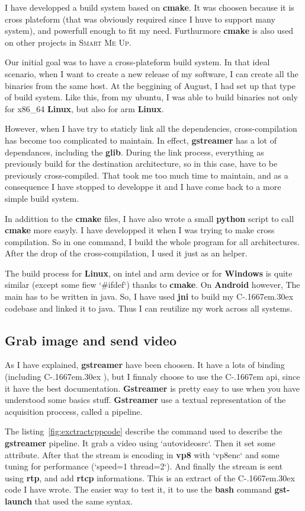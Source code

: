 \documentclass[a4paper,11pt]{custom}
\newcommand{\smu}{\textsc{Smart Me Up}}
\newcommand{\rtp}{\textbf{rtp}\xspace}
\newcommand{\rtcp}{\textbf{rtcp}\xspace}
\newcommand{\gstreamer}{\textbf{gstreamer}\xspace}
\newcommand{\Gstreamer}{\textbf{Gstreamer}\xspace}
\newcommand{\vpx}{\textbf{vp8}\xspace}
\newcommand{\cmake}{\textbf{cmake}\xspace}
\newcommand{\jni}{\textbf{jni}\xspace}
\newcommand{\bash}{\textbf{bash}\xspace}
\newcommand{\python}{\textbf{python}\xspace}
\newcommand{\command}[1]{\textbf{#1}\xspace}
\newcommand{\linux}{\textbf{Linux}\xspace}
\newcommand{\win}{\textbf{Windows}\xspace}
\newcommand{\android}{\textbf{Android}\xspace}
\newcommand{\cpp}{%
  C\kern-.1667em\raise.30ex\hbox{\smaller{++}\xspace}%
  \spacefactor1000%
}
\newcommand{\clang}{%
  C\kern-.1667em%
  \xspace%
}
\begin{document}
I have developped a build system based on \cmake. It was choosen because it is
cross plateform (that was obviously required since I huve to support many
system), and powerfull enough to fit my need. Furthurmore \cmake is also used on
other projects in \smu.

Our initial goal was to have a cross-plateform build system. In that ideal
scenario, when I want to create a new release of my software, I can create all
the binaries from the same host. At the beggining of August, I had set up that
type of build system. Like this, from my ubuntu, I was able to build binaries
not only for x86\_64 \linux, but also for arm \linux.

However, when I have try to staticly link all the dependencies,
cross-compilation has become too complicated to maintain. In effect, \gstreamer
has a lot of dependances, including the \textbf{glib}. During the link process,
everything as previously build for the destination architecture, so in this
case, have to be previously cross-compiled. That took me too much time to
maintain, and as a consequence I have stopped to developpe it and I have come
back to a more simple build system.

In addittion to the \cmake files, I have also wrote a small \python script
to call \cmake more easyly. I have developped it when I was trying to make
cross compilation. So in one command, I build the whole program for all
architectures. After the drop of the cross-compilation, I used it just as an
helper.

The build process for \linux, on intel and arm device or for \win{} is quite
similar (except some fiew `\#ifdef`) thanks to \cmake. On \android{} however,
The main has to be written in java. So, I have used \jni{} to build my \cpp{}
codebase and linked it to java. Thus I can reutilize my work across all systems.

\subsection{Grab image and send video}

As I have explained, \gstreamer have been choosen. It have a lots of binding
(including \cpp), but I finnaly choose to use the \clang api, since it have the
best documentation. \Gstreamer is pretty easy to use when you have understood
some basics stuff. \Gstreamer use a textual representation of the acquisition
proccess, called a pipeline.

The listing~\ref{fig:exctractcppcode} describe the command used to describe the
\gstreamer pipeline. It grab a video using `autovideosrc`. Then it set some
attribute. After that the stream is encoding in \vpx with `vp8enc` and some
tuning for performance (`speed=1 thread=2`). And finally the stream is sent
using \rtp, and add \rtcp informations. This is an extract of the \cpp code
I have wrote. The easier way to test it, it to use the \bash command
\command{gst-launch} that used the same syntax.
\end{document}
